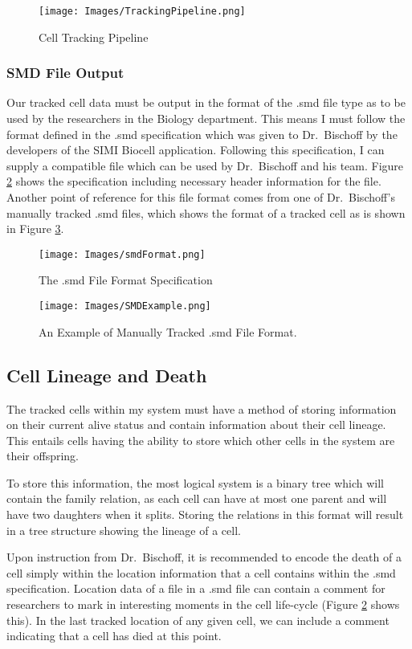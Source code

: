 \documentclass[12pt a4paper]{article}
\begin{document}
\begin{figure}
    \centering
    \texttt{[image: Images/TrackingPipeline.png]}
    \caption{Cell Tracking Pipeline}
    \label{fig:cellTrackPipeline}
\end{figure}
\subsubsection{SMD File Output}
Our tracked cell data must be output in the format of the .smd file type as to be used by the researchers in the Biology department. This means I must follow the format defined in the .smd specification which was given to Dr.~Bischoff by the developers of the SIMI Biocell application. Following this specification, I can supply a compatible file which can be used by Dr.~Bischoff and his team. Figure \ref{fig:smdSpec} shows the specification including necessary header information for the file. Another point of reference for this file format comes from one of Dr.~Bischoff's manually tracked .smd files, which shows the format of a tracked cell as is shown in Figure \ref{fig:smdExample}.
\begin{figure}
    \centering
    \texttt{[image: Images/smdFormat.png]}
    \caption{The .smd File Format Specification}
    \label{fig:smdSpec}
\end{figure}

\begin{figure}
    \centering
    \texttt{[image: Images/SMDExample.png]}
    \caption{An Example of Manually Tracked .smd File Format.}
    \label{fig:smdExample}
\end{figure}
\subsection{Cell Lineage and Death}
The tracked cells within my system must have a method of storing information on their current alive status and contain information about their cell lineage. This entails cells having the ability to store which other cells in the system are their offspring. 

To store this information, the most logical system is a binary tree which will contain the family relation, as each cell can have at most one parent and will have two daughters when it splits. Storing the relations in this format will result in a tree structure showing the lineage of a cell.

Upon instruction from Dr.~Bischoff, it is recommended to encode the death of a cell simply within the location information that a cell contains within the .smd specification. Location data of a file in a .smd file can contain a comment for researchers to mark in interesting moments in the cell life-cycle (Figure \ref{fig:smdSpec} shows this). In the last tracked location of any given cell, we can include a comment indicating that a cell has died at this point. 
\end{document}
